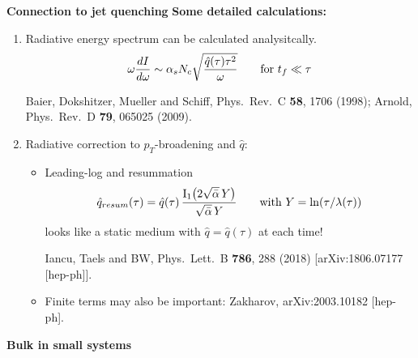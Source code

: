 \documentclass[9pt,a4paper,unknownkeysallowed,xcolor=dvipsnames,aspectratio=43]{beamer}
\newcommand{\abar}{\bar{\alpha}}
\newcommand{\rmI}{{\rm I}}
\begin{document}
%
%
\begin{frame}{\bf\huge Connection to jet quenching}	\vspace{2mm}
{\large\bf Some detailed calculations:}
\vspace{2mm}
\begin{enumerate}
    \item{\large Radiative energy spectrum can be calculated analysitcally.}
    \begin{align}
        \omega\frac{dI}{d\omega} \sim \alpha_s N_c \sqrt{\frac{\hat{q}(\tau)\tau^2}{\omega}}
        \qquad\text{for $t_f \ll \tau$}\notag
    \end{align}
\begin{center}
    {\tiny  {\color{teablue}
  Baier, Dokshitzer, Mueller and Schiff,
  Phys.\ Rev.\ C {\bf 58}, 1706 (1998); Arnold,
  Phys.\ Rev.\ D {\bf 79}, 065025 (2009).
}}    
\end{center}
\vspace{2mm}
    \item{\large Radiative correction to $p_T$-broadening and $\hat{q}$:}\\
    \vspace{2mm}
    \begin{itemize}
        \item{Leading-log and resummation}
        \begin{align}
        \hat{q}_{resum}(\tau) = \hat{q}(\tau)\,
        \frac{\rmI_1\big(2 \sqrt{\abar}\, Y\big)}{\sqrt{\abar}\,Y}\qquad\text{with $Y=\ln(\tau/\lambda(\tau))$}\notag
        \end{align}
        looks like a static medium with $\hat{q} = \hat{q}(\tau)$ at each time!\\
\begin{center}
    {\tiny  {\color{teablue}
  Iancu, Taels and BW,
  Phys.\ Lett.\ B {\bf 786}, 288 (2018)
  [arXiv:1806.07177 [hep-ph]].
  }}
\end{center}
    \vspace{2mm}
        \item{Finite terms may also be important: {\tiny  {\color{teablue}
  Zakharov,
  arXiv:2003.10182 [hep-ph].
}}
}
    \end{itemize}
\end{enumerate}
\end{frame}
%
%
\setcounter{page}{0}
\begin{frame}
\vspace*{\fill}
\begin{center}
{\Huge\bf\color{gray} Bulk in small systems}
\end{center}
\vspace*{\fill}
\end{frame}
\end{document}
